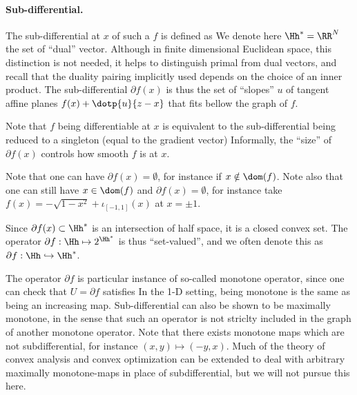 \paragraph{Sub-differential.}

The sub-differential at $x$ of such a $f$ is defined as
We denote here $\Hh^* = \RR^N$ the set of ``dual'' vector. Although in finite dimensional Euclidean space, this distinction is not needed, it helps to distinguish primal from dual vectors, and recall that the duality pairing implicitly used depends on the choice of an inner product.
%
The sub-differential $\partial f(x)$ is thus the set of ``slopes'' $u$ of tangent affine planes $f(x) + \dotp{u}{z-x}$ that fits bellow the graph of $f$. 


Note that $f$ being differentiable at $x$ is equivalent to the sub-differential being reduced to a singleton (equal to the gradient vector)
Informally, the ``size'' of $\partial f(x)$ controls how smooth $f$ is at $x$.

Note that one can have $\partial f(x) = \emptyset$, for instance if $x \notin \dom(f)$. Note also that one can still have $x \in \dom(f)$ and $\partial f(x) = \emptyset$, for instance take $f(x)=-\sqrt{1-x^2} + \iota_{[-1,1]}(x)$ at $x=\pm 1$. 

Since $\partial f(x) \subset \Hh^*$ is an intersection of half space, it is a closed convex set.
%
The operator $\partial f : \Hh \mapsto 2^{\Hh^*}$ is thus ``set-valued'', and we often denote this as $\partial f : \Hh \hookrightarrow \Hh^*$.

\begin{rem}
The operator $\partial f$ is particular instance of so-called monotone operator, since one can check that $U=\partial f$ satisfies 
In the 1-D setting, being monotone is the same as being an increasing map.
%
Sub-differential can also be shown to be maximally monotone, in the sense that such an operator is not striclty included in the graph of another monotone operator. 
%
Note that there exists monotone maps which are not subdifferential, for instance $(x,y) \mapsto (-y,x)$. 
% 
Much of the theory of convex analysis and convex optimization can be extended to deal with arbitrary maximally monotone-maps in place of subdifferential, but we will not pursue this here.
\end{rem}

